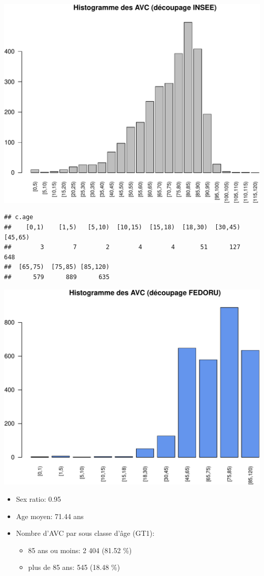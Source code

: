 \documentclass[]{article}
\begin{document}
\includegraphics{rapport2014_V4_files/figure-latex/patients-1.pdf}

\begin{verbatim}
## c.age
##    [0,1)    [1,5)   [5,10)  [10,15)  [15,18)  [18,30)  [30,45)  [45,65) 
##        3        7        2        4        4       51      127      648 
##  [65,75)  [75,85) [85,120) 
##      579      889      635
\end{verbatim}

\includegraphics{rapport2014_V4_files/figure-latex/patients-2.pdf}

\begin{itemize}
\itemsep1pt\parskip0pt
\item
  Sex ratio: 0.95
\item
  Age moyen: 71.44 ans
\item
  Nombre d'AVC par sous classe d'âge (GT1):

  \begin{itemize}
  \itemsep1pt\parskip0pt
  \item
    85 ans ou moins: 2 404 (81.52 \%)
  \item
    plus de 85 ans: 545 (18.48 \%)
  \end{itemize}
\end{itemize}
\end{document}
